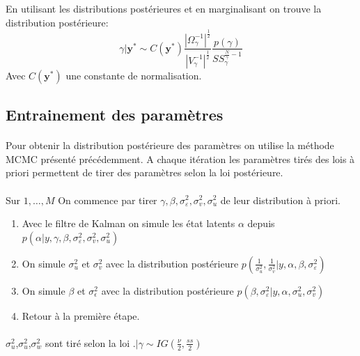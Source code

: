 \documentclass{article}
\theoremstyle{definition}
\theoremstyle{remark}
\begin{document}
En utilisant les distributions postérieures et en marginalisant on trouve la distribution postérieure:
\begin{equation}
	\gamma | \mathbf{y}^{*} \sim C\left(\mathbf{y}^{*}\right) \frac{\left|\Omega_{\gamma}^{-1}\right|^{\frac{1}{2}}}{\left|V_{\gamma}^{-1}\right|^{\frac{1}{2}}} \frac{p(\gamma)}{S S_{\gamma}^{\frac{N}{\gamma}-1}}
	\end{equation}
Avec $ C\left(\mathbf{y}^{*}\right)$ une constante de normalisation.

\subsection{Entrainement des paramètres}
\paragraph{}
Pour obtenir la distribution postérieure des paramètres on utilise la méthode MCMC présenté précédemment.
A chaque itération les paramètres tirés des lois à priori permettent de tirer des paramètres selon la loi postérieure.
\paragraph{}
Sur $1, \ldots, M$
On commence par tirer $\gamma, \beta, \sigma_{\varepsilon}^{2}, \sigma_{v}^{2}, \sigma_{u}^{2}$ de leur distribution à priori.
\begin{enumerate}
\item Avec le filtre de Kalman on simule les état latents $\alpha$ depuis $p\left(\alpha | y, \gamma, \beta, \sigma_{\varepsilon}^{2}, \sigma_{v}^{2}, \sigma_{u}^{2}\right)$
\item On simule $\sigma_u^2$ et $\sigma_v^2$ avec la distribution postérieure $p\left(\frac{1}{\sigma_{u}^{2}}, \frac{1}{\sigma_{v}^{2}} | y, \alpha, \beta, \sigma_{\varepsilon}^{2}\right)$
\item On simule $\beta$ et $\sigma_\epsilon^2$ avec la distribution postérieure $p\left(\beta, \sigma_{\varepsilon}^{2} | y, \alpha, \sigma_{u}^{2}, \sigma_{v}^{2}\right)$
\item Retour à la première étape.
\end{enumerate}
\paragraph{}
$\sigma_u^2$,$\sigma_u^2$,$\sigma_w^2$ sont tiré selon la loi $. | \gamma \sim I G\left(\frac{\nu}{2}, \frac{s s}{2}\right)
$
\end{document}
